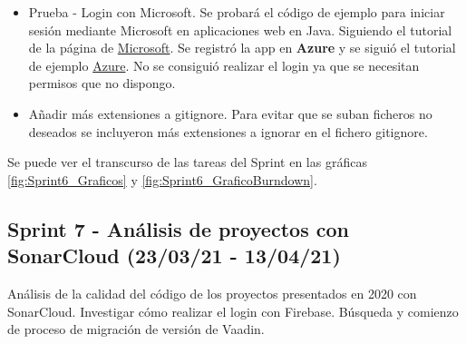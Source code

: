 \begin{itemize}
	\item Prueba - Login con Microsoft.
		Se probará el código de ejemplo para iniciar sesión mediante Microsoft en aplicaciones web en Java. Siguiendo el tutorial de la página de \href{https://docs.microsoft.com/en-us/azure/active-directory/develop/quickstart-v2-java-webapp}{Microsoft}. Se registró la app en \textbf{Azure} y se siguió el tutorial de ejemplo \href{https://portal.azure.com/#blade/Microsoft_AAD_RegisteredApps/ApplicationsListBlade/quickStartType/JavaQuickstartPage/sourceType/docs}{Azure}. No se consiguió realizar el login ya que se necesitan permisos que no dispongo.
	\item Añadir más extensiones a gitignore. 
		Para evitar que se suban ficheros no deseados se incluyeron más extensiones a ignorar en el fichero gitignore. 
	
\end{itemize}

Se puede ver el transcurso de las tareas del Sprint en las gráficas \ref{fig:Sprint6_Graficos} y \ref{fig:Sprint6_GraficoBurndown}.



\subsection{Sprint 7 - Análisis de proyectos con SonarCloud (23/03/21 - 13/04/21)}
Análisis de la calidad del código de los proyectos presentados en 2020 con SonarCloud. Investigar cómo realizar el login con Firebase. Búsqueda y comienzo de proceso de migración de versión de Vaadin.


